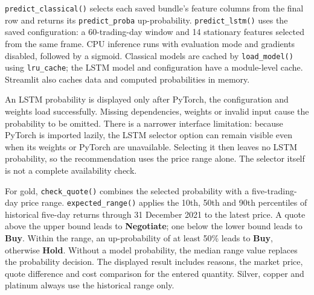 \texttt{predict\_classical()} selects each saved bundle's feature columns
from the final row and returns its \texttt{predict\_proba} up-probability.
\texttt{predict\_lstm()} uses the saved configuration: a 60-trading-day
window and 14 stationary features selected from the same frame. CPU inference
runs with evaluation mode and gradients disabled, followed by a sigmoid.
Classical models are cached by \texttt{load\_model()} using
\texttt{lru\_cache}; the LSTM model and configuration have a module-level
cache. Streamlit also caches data and computed probabilities in memory.

An LSTM probability is displayed only after PyTorch, the configuration and
weights load successfully. Missing dependencies, weights or invalid input
cause the probability to be omitted. There is a narrower interface
limitation: because PyTorch is imported lazily, the LSTM selector option can
remain visible even when its weights or PyTorch are unavailable. Selecting
it then leaves no LSTM probability, so the recommendation uses the price
range alone. The selector itself is not a complete availability check.

For gold, \texttt{check\_quote()} combines the selected probability with a
five-trading-day price range. \texttt{expected\_range()} applies the 10th,
50th and 90th percentiles of historical five-day returns through
31 December 2021 to the latest price. A quote above the upper bound leads to
\textbf{Negotiate}; one below the lower bound leads to \textbf{Buy}. Within
the range, an up-probability of at least 50\% leads to \textbf{Buy}, otherwise
\textbf{Hold}. Without a model probability, the median range value replaces
the probability decision. The displayed result includes reasons, the market
price, quote difference and cost comparison for the entered quantity.
Silver, copper and platinum always use the historical range only.

